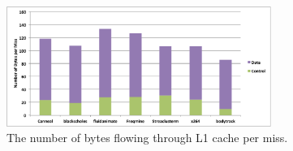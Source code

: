 \begin{figure}[h]
  \centering
  \includegraphics[height = 2.2 in, width=3.4in]{figures/figure1.pdf}
  \caption{The number of bytes flowing through L1 cache per miss.}
  \label{fig:profile}
\end{figure}
